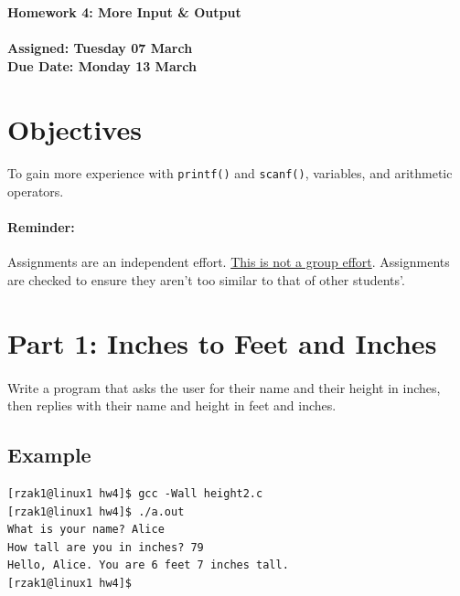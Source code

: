\documentclass[letter,11pt]{article}
\begin{document}
\huge
\textbf{Homework 4: More Input \& Output}
\normalsize
\\ ~~ \\
\textbf{Assigned: Tuesday 07 March} \\
\textbf{Due Date: Monday 13 March}

\section*{Objectives}
\paragraph{}To gain more experience with \texttt{printf()} and \texttt{scanf()}, variables, and arithmetic operators.

\paragraph{Reminder:} Assignments are an independent effort. \underline{This is not a group effort}. Assignments are checked to ensure they aren't too similar to that of other students'.

\section*{Part 1: Inches to Feet and Inches}
\paragraph{}Write a program that asks the user for their name and their height in inches, then replies with their name and height in feet and inches. 

\subsection*{Example}
\begin{verbatim}
[rzak1@linux1 hw4]$ gcc -Wall height2.c
[rzak1@linux1 hw4]$ ./a.out
What is your name? Alice
How tall are you in inches? 79
Hello, Alice. You are 6 feet 7 inches tall.
[rzak1@linux1 hw4]$ 
\end{verbatim}
\end{document}
